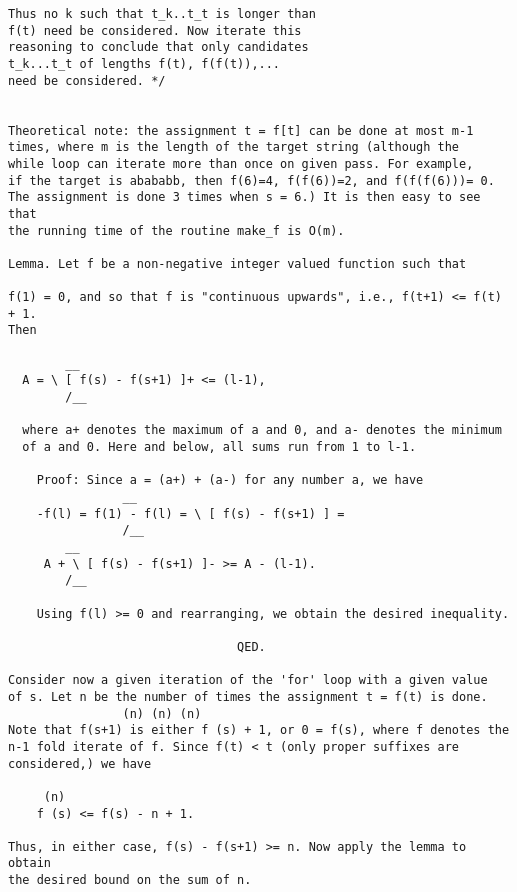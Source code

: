 \begin{verbatim}
Thus no k such that t_k..t_t is longer than
f(t) need be considered. Now iterate this
reasoning to conclude that only candidates
t_k...t_t of lengths f(t), f(f(t)),...
need be considered. */


Theoretical note: the assignment t = f[t] can be done at most m-1
times, where m is the length of the target string (although the
while loop can iterate more than once on given pass. For example,
if the target is abababb, then f(6)=4, f(f(6))=2, and f(f(f(6)))= 0.
The assignment is done 3 times when s = 6.) It is then easy to see that
the running time of the routine make_f is O(m).

Lemma. Let f be a non-negative integer valued function such that

f(1) = 0, and so that f is "continuous upwards", i.e., f(t+1) <= f(t) + 1.
Then

		__
  A = \ [ f(s) - f(s+1) ]+ <= (l-1),
		/__

  where a+ denotes the maximum of a and 0, and a- denotes the minimum
  of a and 0. Here and below, all sums run from 1 to l-1.

	Proof: Since a = (a+) + (a-) for any number a, we have
				__
	-f(l) = f(1) - f(l) = \ [ f(s) - f(s+1) ] =
				/__
		__
     A + \ [ f(s) - f(s+1) ]- >= A - (l-1).
		/__

	Using f(l) >= 0 and rearranging, we obtain the desired inequality.

								QED.

Consider now a given iteration of the 'for' loop with a given value
of s. Let n be the number of times the assignment t = f(t) is done.
			    (n) (n) (n)
Note that f(s+1) is either f (s) + 1, or 0 = f(s), where f denotes the
n-1 fold iterate of f. Since f(t) < t (only proper suffixes are
considered,) we have

	 (n)
	f (s) <= f(s) - n + 1.

Thus, in either case, f(s) - f(s+1) >= n. Now apply the lemma to obtain
the desired bound on the sum of n.

\end{verbatim}
